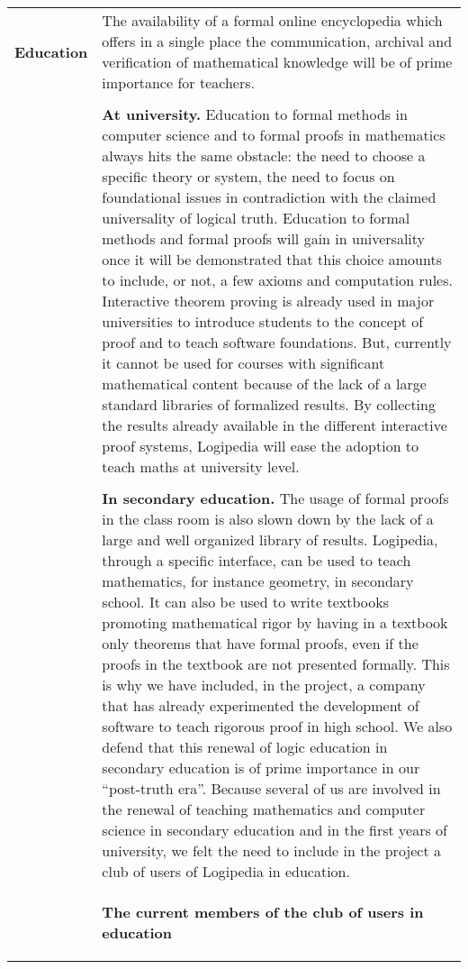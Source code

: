 \begin{longtable}{|p{}|p{}|}
\hline
{\bf Education}
&
The availability of a formal online encyclopedia which offers in a
single place the communication, archival and verification of
mathematical knowledge will be of prime importance for teachers.\\
&\\
&
{\bf At university.}
Education to formal methods in computer science and to formal proofs
in mathematics always hits the same obstacle: the need to choose a
specific theory or system, the need to focus on foundational issues in
contradiction with the claimed universality of logical truth.
Education to formal methods and formal proofs will gain in
universality once it will be demonstrated that this choice amounts to
include, or not, a few axioms and computation rules.  Interactive
theorem proving is already used in major universities to introduce
students to the concept of proof and to teach software foundations.
But, currently it cannot be used for courses with significant
mathematical content because of the lack of a large standard libraries
of formalized results.  By collecting the results already available in
the different interactive proof systems, Logipedia will ease the
adoption to teach maths at university level.\\
&\\
&
{\bf In secondary education.}
The usage of formal proofs in the class room is also slown down by the
lack of a large and well organized library of results.  Logipedia,
through a specific interface, can be used to teach mathematics, for
instance geometry, in secondary school.  It can also be used to write
textbooks promoting mathematical rigor by having in a textbook only
theorems that have formal proofs, even if the proofs in the textbook
are not presented formally. 
This is why we have included, in the project, a company that has 
already experimented the development of software to teach rigorous proof
in high school. 
We also defend that this renewal of logic education in secondary education
is of prime importance in our ``post-truth era''.
Because several of us are involved in the renewal of teaching
mathematics and computer science in secondary education and in the
first years of university, we felt the need to include in the project
a club of users of Logipedia in education.\\
&
\begin{framed}
\begin{center}
{\bf \Large The current members of the club of users in education}
\end{center}


\end{framed}
\end{longtable}

